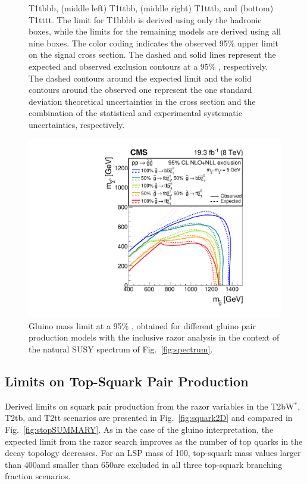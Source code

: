 \begin{figure}[t]
{  T1tbbb, (middle left) T1ttbb, (middle right) T1tttb, and (bottom) T1tttt. The limit for T1bbbb
  is derived using only the hadronic boxes, while the limits for the
  remaining models are derived using all nine boxes. The color coding
  indicates the observed 95\% \CL upper limit on the signal cross
  section. The dashed and solid lines represent the expected and
  observed exclusion contours at a 95\% \CL, respectively. The dashed
  contours around the expected limit and the solid contours around the
  observed one represent the one standard deviation theoretical
  uncertainties in
  the cross section and the combination of the statistical and
  experimental systematic uncertainties,
  respectively.\label{fig:gluino2D}}
\end{figure}

\begin{figure}[tb!]
\centering
\includegraphics[width=\cmsFigWidth]{figs/analysis8TeV/T1HybridNew0Lp1Lp2LBARE.pdf}
\caption{Gluino mass limit at a 95\% \CL, obtained for different gluino
  pair production models with the inclusive razor analysis in the
  context of the natural SUSY spectrum of
  Fig.~\ref{fig:spectrum}.\label{fig:gluinogluinoSUMMARY}}

\end{figure}



\subsection{Limits on Top-Squark Pair Production}
\label{sec:interp:stop}

Derived limits on squark pair production from the razor variables in
the T2bW$^{\ast}$, T2tb, and T2tt scenarios are presented in
Fig.~\ref{fig:squark2D} and compared in
Fig.~\ref{fig:stopSUMMARY}. As in the
case of the gluino interpretation, the expected limit from the razor
search improves as the number of top quarks in the decay topology
decreases.
For an LSP mass of 100\GeV, top-squark mass values larger than
400\GeV and smaller than 650\GeV are excluded in all three
top-squark branching fraction scenarios.

